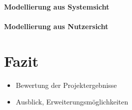 \documentclass[12pt, oneside, smallheadings]{scrbook}
\begin{document}
\subsubsection{Modellierung aus Systemsicht}

\subsubsection{Modellierung aus Nutzersicht}



\chapter{Fazit}
\begin{itemize}
	\item Bewertung der Projektergebnisse
	\item Ausblick, Erweiterungsmöglichkeiten
\end{itemize}

\newpage

%
%


\appendix


\end{document}
